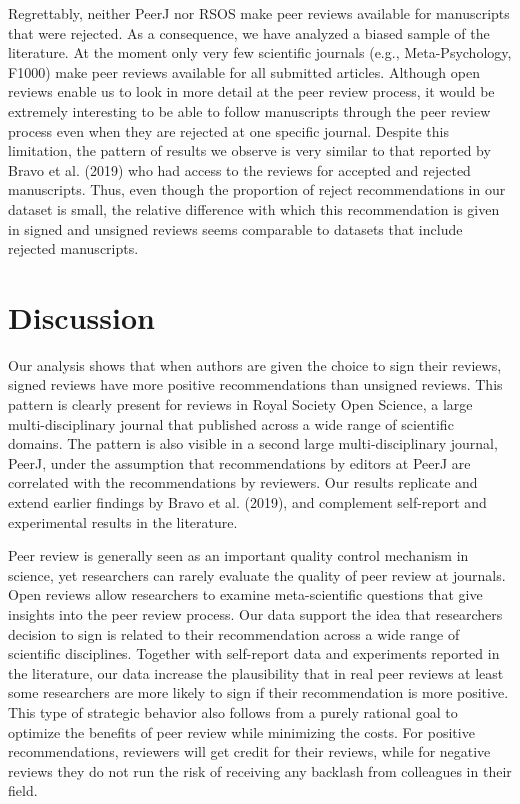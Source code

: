 \documentclass[,jou, a4paper,floatsintext]{apa6}
\begin{document}
Regrettably, neither PeerJ nor RSOS make peer reviews available for manuscripts that were rejected. As a consequence, we have analyzed a biased sample of the literature. At the moment only very few scientific journals (e.g., Meta-Psychology, F1000) make peer reviews available for all submitted articles. Although open reviews enable us to look in more detail at the peer review process, it would be extremely interesting to be able to follow manuscripts through the peer review process even when they are rejected at one specific journal. Despite this limitation, the pattern of results we observe is very similar to that reported by Bravo et al. (2019) who had access to the reviews for accepted and rejected manuscripts. Thus, even though the proportion of reject recommendations in our dataset is small, the relative difference with which this recommendation is given in signed and unsigned reviews seems comparable to datasets that include rejected manuscripts.

\hypertarget{discussion}{%
\section{Discussion}\label{discussion}}

Our analysis shows that when authors are given the choice to sign their reviews, signed reviews have more positive recommendations than unsigned reviews. This pattern is clearly present for reviews in Royal Society Open Science, a large multi-disciplinary journal that published across a wide range of scientific domains. The pattern is also visible in a second large multi-disciplinary journal, PeerJ, under the assumption that recommendations by editors at PeerJ are correlated with the recommendations by reviewers. Our results replicate and extend earlier findings by Bravo et al. (2019), and complement self-report and experimental results in the literature.

Peer review is generally seen as an important quality control mechanism in science, yet researchers can rarely evaluate the quality of peer review at journals. Open reviews allow researchers to examine meta-scientific questions that give insights into the peer review process. Our data support the idea that researchers decision to sign is related to their recommendation across a wide range of scientific disciplines. Together with self-report data and experiments reported in the literature, our data increase the plausibility that in real peer reviews at least some researchers are more likely to sign if their recommendation is more positive. This type of strategic behavior also follows from a purely rational goal to optimize the benefits of peer review while minimizing the costs. For positive recommendations, reviewers will get credit for their reviews, while for negative reviews they do not run the risk of receiving any backlash from colleagues in their field.
\end{document}
